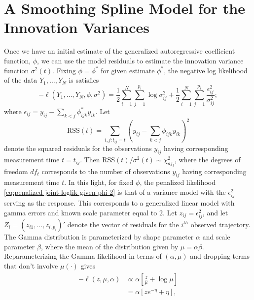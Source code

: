 \section{A Smoothing Spline Model for the Innovation Variances} \label{chapter-3-IV-modeling-section}
%

Once we have an initial estimate of the generalized autoregressive coefficient function, $\phi$, we can use the model residuals to estimate the innovation variance function $\sigma^2\left(t\right)$. Fixing $\phi = \phi^*$ for given estimate $\phi^*$, the negative log likelihood of the data $Y_1,\dots, Y_N$ is satisfies
\begin{equation} \label{eq:penalized-joint-loglik-given-phi-2}
-\ell\left( Y_1,\dots, Y_N, \phi, \sigma^2 \right) =  \frac{1}{2}\sum_{i = 1}^N \sum_{j = 1}^{p_i} \log \sigma^2_{ij}  + \frac{1}{2}\sum_{i = 1}^N \sum_{j = 1}^{p_i} \frac {\epsilon_{ij}^2}{\sigma^2_{ij}};
\end{equation}
\noindent
where $\epsilon_{ij} =  y_{ij} - \sum_{k<j} \phi^*_{ijk} y_{ik}$. Let 
\begin{equation}
\mbox{RSS}\left( t \right) = \sum_{i,j:t_{ij}= t} \left( y_{ij} - \sum_{k<j} \phi_{ijk} y_{ik}\right)^2
\end{equation}
\noindent
denote the squared residuals for the observations $y_{ij}$ having corresponding measurement time $t = t_{ij}$. Then $\mbox{RSS}\left( t \right)/\sigma^2\left(t\right) \sim \chi^2_{df_t}$, where the degrees of freedom $df_{t}$ corresponds to the number of observations $y_{ij}$ having corresponding measurement time $t$. In this light, for fixed $\phi$, the penalized likelihood \ref{eq:penalized-joint-loglik-given-phi-2} is that of a variance model with the $\epsilon_{ij}^2$ serving as the response.  This corresponds to a generalized linear model with gamma errors and known scale parameter equal to 2. Let $z_{ij} = \epsilon_{ij}^2$, and let $Z_{i} = \left(z_{i1},\dots, z_{i,p_i} \right)'$ denote the vector of residuals for the $i^{th}$ observed trajectory. The Gamma distribution is parameterized by shape parameter $\alpha$ and scale parameter $\beta$, where the mean of the distribution given by $\mu = \alpha \beta$. Reparameterizing the Gamma likelihood in terms of $\left(\alpha, \mu \right)$ and dropping terms that don't involve $\mu\left(\cdot\right)$ gives  
\begin{align}
\begin{split}
-\ell\left(z,\mu, \alpha \right) &\propto \alpha\left[\frac{z}{\mu} + \log \mu\right]  \\ 
&= \alpha\left[ze^{-\eta} + \eta\right],\label{eq:gamma-iv-likelihood-canonical-link}
\end{split}
\end{align}
